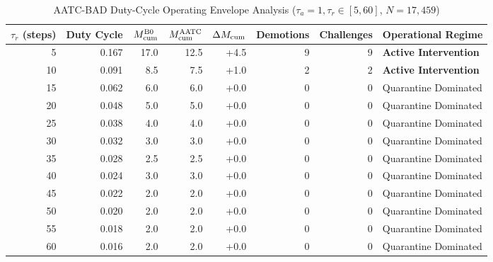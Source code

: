 \begin{table}[t]
\centering
\caption{AATC-BAD Duty-Cycle Operating Envelope Analysis ($\tau_a=1, \tau_r \in [5, 60]$, $N=17,459$)}
\label{tab:operating_envelope}
\small
\begin{tabular}{rrrrrrrl}
\hline
\textbf{$\tau_r$ (steps)} & \textbf{Duty Cycle} & \textbf{$M_{\rm cum}^{\rm B0}$} & \textbf{$M_{\rm cum}^{\rm AATC}$} & \textbf{$\Delta M_{\rm cum}$} & \textbf{Demotions} & \textbf{Challenges} & \textbf{Operational Regime} \\
\hline
5 & 0.167 & 17.0 & 12.5 & +4.5 & 9 & 9 & \textbf{Active Intervention} \\
10 & 0.091 & 8.5 & 7.5 & +1.0 & 2 & 2 & \textbf{Active Intervention} \\
15 & 0.062 & 6.0 & 6.0 & +0.0 & 0 & 0 & Quarantine Dominated \\
20 & 0.048 & 5.0 & 5.0 & +0.0 & 0 & 0 & Quarantine Dominated \\
25 & 0.038 & 4.0 & 4.0 & +0.0 & 0 & 0 & Quarantine Dominated \\
30 & 0.032 & 3.0 & 3.0 & +0.0 & 0 & 0 & Quarantine Dominated \\
35 & 0.028 & 2.5 & 2.5 & +0.0 & 0 & 0 & Quarantine Dominated \\
40 & 0.024 & 3.0 & 3.0 & +0.0 & 0 & 0 & Quarantine Dominated \\
45 & 0.022 & 2.0 & 2.0 & +0.0 & 0 & 0 & Quarantine Dominated \\
50 & 0.020 & 2.0 & 2.0 & +0.0 & 0 & 0 & Quarantine Dominated \\
55 & 0.018 & 2.0 & 2.0 & +0.0 & 0 & 0 & Quarantine Dominated \\
60 & 0.016 & 2.0 & 2.0 & +0.0 & 0 & 0 & Quarantine Dominated \\
\hline
\end{tabular}
\end{table}
